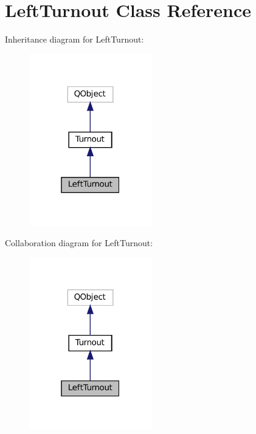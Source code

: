 \hypertarget{classLeftTurnout}{}\section{Left\+Turnout Class Reference}
\label{classLeftTurnout}


Inheritance diagram for Left\+Turnout\+:
\nopagebreak
\begin{figure}[H]
\begin{center}
\leavevmode
\includegraphics[width=151pt]{classLeftTurnout__inherit__graph}
\end{center}
\end{figure}


Collaboration diagram for Left\+Turnout\+:
\nopagebreak
\begin{figure}[H]
\begin{center}
\leavevmode
\includegraphics[width=151pt]{classLeftTurnout__coll__graph}
\end{center}
\end{figure}
